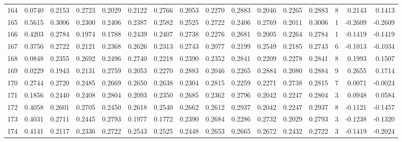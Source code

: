 \begin{tabular}{lrrrrrrrrrrrrrrr}
164 &      0.0740 &  0.2153 &  0.2723 &  0.2029 &  0.2122 &  0.2766 &  0.2053 &  0.2270 &  0.2883 &  0.2046 &   0.2265 &     0.2883 &      8 &                    0.2143 &                     0.1413 \\
165 &      0.5615 &  0.3006 &  0.2300 &  0.2406 &  0.2387 &  0.2582 &  0.2525 &  0.2722 &  0.2406 &  0.2769 &   0.2011 &     0.3006 &      1 &                   -0.2609 &                    -0.2609 \\
166 &      0.4203 &  0.2784 &  0.1974 &  0.1788 &  0.2439 &  0.2407 &  0.2738 &  0.2276 &  0.2681 &  0.2005 &   0.2264 &     0.2784 &      1 &                   -0.1419 &                    -0.1419 \\
167 &      0.3756 &  0.2722 &  0.2121 &  0.2368 &  0.2626 &  0.2313 &  0.2743 &  0.2077 &  0.2199 &  0.2549 &   0.2185 &     0.2743 &      6 &                   -0.1013 &                    -0.1034 \\
168 &      0.0848 &  0.2355 &  0.2692 &  0.2496 &  0.2740 &  0.2218 &  0.2390 &  0.2352 &  0.2841 &  0.2209 &   0.2278 &     0.2841 &      8 &                    0.1993 &                     0.1507 \\
169 &      0.0229 &  0.1943 &  0.2131 &  0.2759 &  0.2053 &  0.2270 &  0.2883 &  0.2046 &  0.2265 &  0.2884 &   0.2080 &     0.2884 &      9 &                    0.2655 &                     0.1714 \\
170 &      0.2744 &  0.2720 &  0.2485 &  0.2669 &  0.2650 &  0.2638 &  0.2304 &  0.2815 &  0.2259 &  0.2271 &   0.2738 &     0.2815 &      7 &                    0.0071 &                    -0.0024 \\
171 &      0.1856 &  0.2440 &  0.2408 &  0.2804 &  0.2093 &  0.2350 &  0.2685 &  0.2362 &  0.2796 &  0.2042 &   0.2247 &     0.2804 &      3 &                    0.0948 &                     0.0584 \\
172 &      0.4058 &  0.2601 &  0.2705 &  0.2450 &  0.2618 &  0.2540 &  0.2662 &  0.2612 &  0.2937 &  0.2042 &   0.2247 &     0.2937 &      8 &                   -0.1121 &                    -0.1457 \\
173 &      0.4031 &  0.2711 &  0.2445 &  0.2793 &  0.1977 &  0.1772 &  0.2390 &  0.2684 &  0.2286 &  0.2732 &   0.2029 &     0.2793 &      3 &                   -0.1238 &                    -0.1320 \\
174 &      0.4141 &  0.2117 &  0.2336 &  0.2722 &  0.2543 &  0.2525 &  0.2448 &  0.2653 &  0.2665 &  0.2672 &   0.2432 &     0.2722 &      3 &                   -0.1419 &                    -0.2024 \\

\end{tabular}
